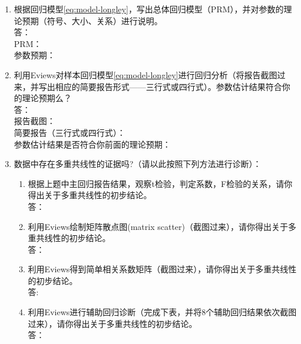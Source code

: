 \documentclass[12pt,(landscape,a4paper),(portrait,a4paper)]{article}
\begin{document}
\begin{enumerate}
\def\labelenumi{\arabic{enumi}.}
\item
  根据回归模型\eqref{eq:model-longley}，写出总体回归模型（PRM），并对参数的理论预期（符号、大小、关系）进行说明。\\
  答：\\
  PRM：\\
  参数预期：
\item
  利用Eviews对样本回归模型\eqref{eq:model-longley}进行回归分析（将报告截图过来，并写出相应的简要报告形式------三行式或四行式）。参数估计结果符合你的理论预期么？\\
  答：\\
  报告截图：\\
  简要报告（三行式或四行式）：\\
  参数估计结果是否符合你前面的理论预期：
\item
  数据中存在多重共线性的证据吗?（请以此按照下列方法进行诊断）：

  \begin{enumerate}
  \def\labelenumii{\alph{enumii}.}
  \item
    根据上题中主回归报告结果，观察t检验，判定系数，F检验的关系，请你得出关于多重共线性的初步结论。\\
    答：
  \item
    利用Eviews绘制矩阵散点图(matrix
    scatter)（截图过来），请你得出关于多重共线性的初步结论。\\
    答：
  \item
    利用Eviews得到简单相关系数矩阵（截图过来），请你得出关于多重共线性的初步结论。\\
    答:
  \item
    利用Eviews进行辅助回归诊断（完成下表，并将8个辅助回归结果依次截图过来），请你得出关于多重共线性的初步结论。\\
    答：
  \end{enumerate}
\end{enumerate}
\end{document}

